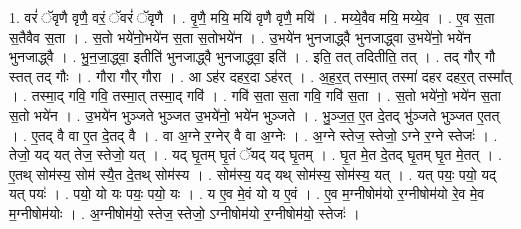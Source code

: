 \documentclass[17pt]{extarticle}
\begin{document}
1. वरं॑ ॅवृणै वृणै॒ वरं॒ ॅवरं॑ ॅवृणै । . वृ॒णै॒ मयि॒ मयि॑ वृणै वृणै॒ मयि॑ । . मय्ये॒वैव मयि॒ मय्ये॒व । . ए॒व स॒ता स॒तैवैव स॒ता । . स॒तो भये॑नो॒भये॑न स॒ता स॒तोभये॑न । . उ॒भये॑न भुनजाद्ध्वै भुनजाद्ध्वा उ॒भये॑नो॒ भये॑न भुनजाद्ध्वै । . भु॒न॒जा॒द्ध्वा॒ इतीति॑ भुनजाद्ध्वै भुनजाद्ध्वा॒ इति॑ । . इति॒ तत् तदितीति॒ तत् । . तद् गौर् गौ स्तत् तद् गौः । . गौरा गौर् गौरा । . आ ऽह॑र दहर॒दा ऽह॑रत् । . अ॒ह॒र॒त् तस्मा॒त् तस्मा॑ दहर दहर॒त् तस्मा᳚त् । . तस्मा॒द् गवि॒ गवि॒ तस्मा॒त् तस्मा॒द् गवि॑ । . गवि॑ स॒ता स॒ता गवि॒ गवि॑ स॒ता । . स॒तो भये॑नो॒ भये॑न स॒ता स॒तो भये॑न । . उ॒भये॑न भुञ्जते भुञ्जत उ॒भये॑नो॒ भये॑न भुञ्जते । . भु॒ञ्ज॒त॒ ए॒त दे॒तद् भु॑ञ्जते भुञ्जत ए॒तत् । . ए॒तद् वै वा ए॒त दे॒तद् वै । . वा अ॒ग्ने र॒ग्नेर् वै वा अ॒ग्नेः । . अ॒ग्ने स्तेज॒ स्तेजो॒ ऽग्ने र॒ग्ने स्तेजः॑ । . तेजो॒ यद् यत् तेज॒ स्तेजो॒ यत् । . यद् घृ॒तम् घृ॒तं ॅयद् यद् घृ॒तम् । . घृ॒त मे॒त दे॒तद् घृ॒तम् घृ॒त मे॒तत् । . ए॒तथ् सोम॑स्य॒ सोम॑ स्यै॒त दे॒तथ् सोम॑स्य । . सोम॑स्य॒ यद् यथ् सोम॑स्य॒ सोम॑स्य॒ यत् । . यत् पयः॒ पयो॒ यद् यत् पयः॑ । . पयो॒ यो यः पयः॒ पयो॒ यः । . य ए॒व मे॒वं यो य ए॒वं । . ए॒व म॒ग्नीषोम॑यो र॒ग्नीषोम॑यो रे॒व मे॒व म॒ग्नीषोम॑योः । . अ॒ग्नीषोम॑यो॒ स्तेज॒ स्तेजो॒ ऽग्नीषोम॑यो र॒ग्नीषोम॑यो॒ स्तेजः॑ । \newline
\end{document}
